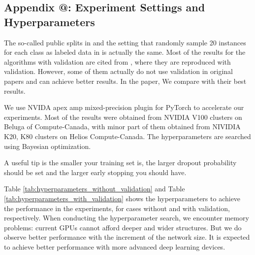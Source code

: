 \documentclass{article}
\makeatletter
\newcommand*{\rom}[1]{\expandafter\@slowromancap\romannumeral #1@}
\makeatother
\begin{document}
\subsection*{Appendix \rom{5}: Experiment Settings and Hyperparameters}
\label{appendix:5}
The so-called public splits in \cite{liao2019lanczos} and the setting that randomly sample 20 instances for each class as labeled data in \cite{yang2016revisiting} is actually the same. Most of the results for the algorithms with validation are cited from \cite{liao2019lanczos}, where they are reproduced with validation. However, some of them actually do not use validation in original papers and can achieve better results. In the paper, We compare with their best results.

We use NVIDA apex amp mixed-precision plugin for PyTorch to accelerate our experiments. Most of the results were obtained from NVIDIA V100 clusters on Beluga of Compute-Canada, with minor part of them obtained from NIVIDIA K20, K80 clusters on Helios Compute-Canada. The hyperparameters are searched using Bayesian optimization.

A useful tip is the smaller your training set is, the larger dropout probability should be set and the larger early stopping you should have.

Table \ref{tab:hyperparameters_without_validation} and Table \ref{tab:hyperparameters_with_validation} shows the hyperparameters to achieve the performance in the experiments, for cases without and with validation, respectively. When conducting the hyperparameter search, we encounter memory problems: current GPUs cannot afford deeper and wider structures. But we do observe better performance with the increment of the network size. It is expected to achieve better performance with more advanced deep learning devices.




\end{document}
